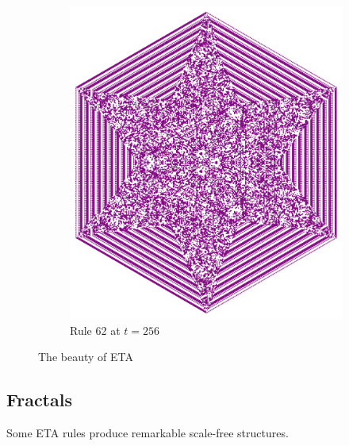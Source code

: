 \documentclass{article}
\begin{document}
\begin{figure}[H]
\begin{subfigure}[b]{0.45\textwidth}
        \includegraphics[width=\textwidth]{graphics/behavior/beauty/rule-62-time-256-OneAlive.pdf}
        \caption{Rule 62 at $t=256$}
        \label{fig:rule-62-time-256-OneAlive}
    \end{subfigure}
    \caption{The beauty of ETA}
    \label{fig:beauty}
\end{figure}

\pagebreak
\subsection{Fractals} \label{fractals}
Some ETA rules produce remarkable scale-free structures. 
\end{document}
